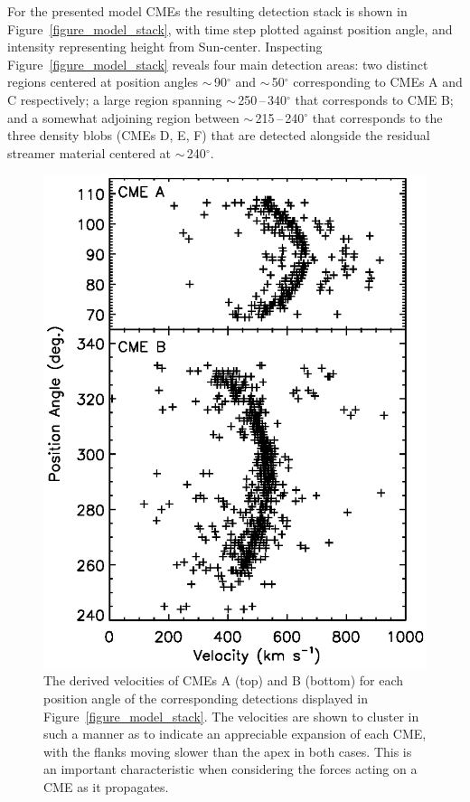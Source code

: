 \documentclass[preprint2]{aastex}
\begin{document}
For the presented model CMEs the resulting detection stack is shown in Figure~\ref{figure_model_stack}, with time step plotted against position angle, and intensity representing height from Sun-center. Inspecting Figure~\ref{figure_model_stack} reveals four main detection areas: two distinct regions centered at position angles $\sim$\,90$^{\circ}$ and $\sim$\,50$^{\circ}$ corresponding to CMEs A and C respectively; a large region spanning $\sim$\,250\,--\,340$^{\circ}$ that corresponds to CME B; and a somewhat adjoining region between $\sim$\,215\,--\,240$^{\circ}$ that corresponds to the three density blobs (CMEs D, E, F) that are detected alongside the residual streamer material centered at $\sim$\,240$^{\circ}$. 

\begin{figure}[!t]
\centerline{\includegraphics[scale=0.65, clip=true, trim=0 0 0 0]{figure_model_vel_angles_CMEsAB.eps}}
\caption{The derived velocities of CMEs A (top) and B (bottom) for each position angle of the corresponding detections displayed in Figure~\ref{figure_model_stack}. The velocities are shown to cluster in such a manner as to indicate an appreciable expansion of each CME, with the flanks moving slower than the apex in both cases. This is an important characteristic when considering the forces acting on a CME as it propagates.}
\label{figure_model_vel_angles_CMEsAB}
\end{figure}
\end{document}
